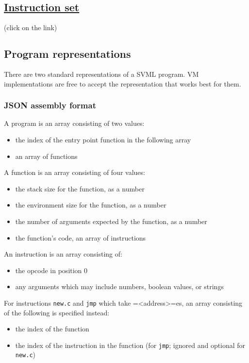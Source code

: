\subsection{\href{SVML-Instruction-Set}{Instruction set}}
\label{sec:org5170515}
(click on the link)

\subsection{Program representations}
\label{sec:org93986c5}
There are two standard representations of a SVML program. VM
implementations are free to accept the representation that works best
for them.

\subsubsection{JSON assembly format}
\label{sec:org5024ad9}
A program is an array consisting of two values:

\begin{itemize}
\item the index of the entry point function in the following array
\item an array of functions
\end{itemize}

A function is an array consisting of four values:

\begin{itemize}
\item the stack size for the function, as a number
\item the environment size for the function, as a number
\item the number of arguments expected by the function, as a number
\item the function's code, an array of instructions
\end{itemize}

An instruction is an array consisting of:

\begin{itemize}
\item the opcode in position 0
\item any arguments which may include numbers, boolean values, or strings
\end{itemize}

For instructions \texttt{new.c} and \texttt{jmp} which take =<address>=es, an array
consisting of the following is specified instead:

\begin{itemize}
\item the index of the function
\item the index of the instruction in the function (for \texttt{jmp}; ignored and
optional for \texttt{new.c})
\end{itemize}

